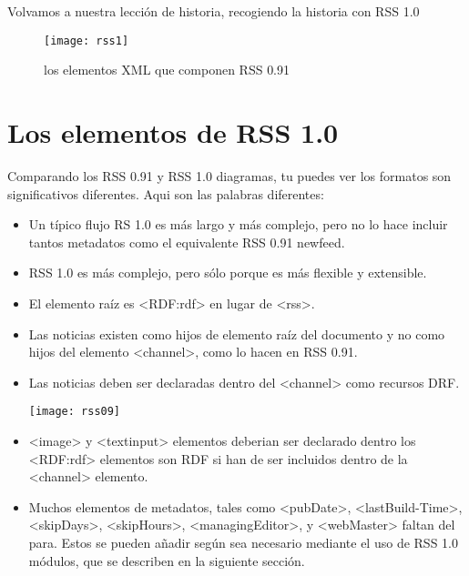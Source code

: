 Volvamos a nuestra lección de historia, recogiendo la historia con RSS 1.0

\begin{figure}[!htb]
\centering
\texttt{[image: rss1]}
\caption{los elementos XML que componen RSS 0.91}
\end{figure}


\section{Los elementos de RSS 1.0}

Comparando los RSS 0.91 y RSS 1.0 diagramas, tu puedes ver los formatos son significativos diferentes.
Aqui son las palabras diferentes:

\begin{itemize}

\item Un típico flujo RS 1.0 es más largo y más complejo, pero no lo hace incluir tantos metadatos como el
equivalente RSS 0.91 newfeed.

\item RSS 1.0 es más complejo, pero sólo porque es más flexible y extensible.

\item El elemento raíz es <RDF:rdf> en lugar de <rss>.

\item Las noticias existen como hijos de elemento raíz del documento y no como hijos del elemento <channel>,
como lo hacen en RSS 0.91.

\item Las noticias deben ser declaradas dentro del <channel> como recursos DRF. \par

\begin{minipage}{1.0\linewidth}
	\texttt{[image: rss09]}
\end{minipage}

\item <image> y <textinput> elementos deberian ser declarado dentro los <RDF:rdf> elementos son RDF
si han de ser incluidos dentro de la <channel> elemento.

\item Muchos elementos de metadatos, tales como  <pubDate>, <lastBuild-Time>, <skipDays>,
<skipHours>, <managingEditor>, y <webMaster> faltan del para. Estos se pueden añadir según sea necesario
mediante el uso de RSS 1.0 módulos, que se describen en la siguiente sección.

\end{itemize}

